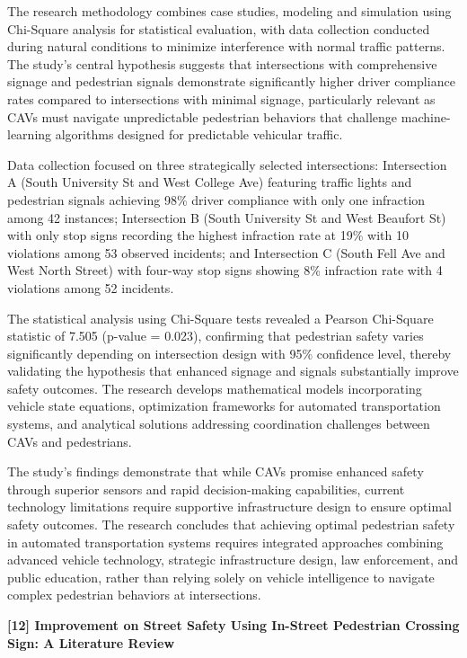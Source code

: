 \documentclass[a4paper, 12pt]{report}
\begin{document}
The research methodology combines case studies, modeling and simulation using Chi-Square analysis for statistical evaluation, with data collection conducted during natural conditions to minimize interference with normal traffic patterns. The study's central hypothesis suggests that intersections with comprehensive signage and pedestrian signals demonstrate significantly higher driver compliance rates compared to intersections with minimal signage, particularly relevant as CAVs must navigate unpredictable pedestrian behaviors that challenge machine-learning algorithms designed for predictable vehicular traffic.

Data collection focused on three strategically selected intersections: Intersection A (South University St and West College Ave) featuring traffic lights and pedestrian signals achieving 98\% driver compliance with only one infraction among 42 instances; Intersection B (South University St and West Beaufort St) with only stop signs recording the highest infraction rate at 19\% with 10 violations among 53 observed incidents; and Intersection C (South Fell Ave and West North Street) with four-way stop signs showing 8\% infraction rate with 4 violations among 52 incidents.

The statistical analysis using Chi-Square tests revealed a Pearson Chi-Square statistic of 7.505 (p-value = 0.023), confirming that pedestrian safety varies significantly depending on intersection design with 95\% confidence level, thereby validating the hypothesis that enhanced signage and signals substantially improve safety outcomes. The research develops mathematical models incorporating vehicle state equations, optimization frameworks for automated transportation systems, and analytical solutions addressing coordination challenges between CAVs and pedestrians.

The study's findings demonstrate that while CAVs promise enhanced safety through superior sensors and rapid decision-making capabilities, current technology limitations require supportive infrastructure design to ensure optimal safety outcomes. The research concludes that achieving optimal pedestrian safety in automated transportation systems requires integrated approaches combining advanced vehicle technology, strategic infrastructure design, law enforcement, and public education, rather than relying solely on vehicle intelligence to navigate complex pedestrian behaviors at intersections.

\noindent \textbf{[12] Improvement on Street Safety Using In-Street Pedestrian Crossing Sign: A Literature Review}
\end{document}
